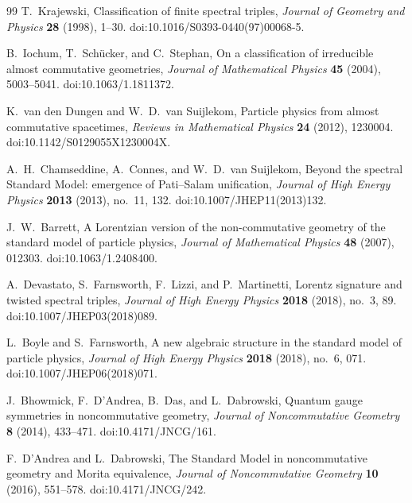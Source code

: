 \documentclass[11pt]{article}
\numberwithin{equation}{section}
\theoremstyle{definition}
\theoremstyle{remark}
\begin{document}
\begin{thebibliography}{99}
T.~Krajewski,
\newblock Classification of finite spectral triples,
\newblock \emph{Journal of Geometry and Physics} \textbf{28} (1998), 1--30.
\newblock doi:10.1016/S0393-0440(97)00068-5.

B.~Iochum, T.~Sch\"ucker, and C.~Stephan,
\newblock On a classification of irreducible almost commutative geometries,
\newblock \emph{Journal of Mathematical Physics} \textbf{45} (2004),
5003--5041.
\newblock doi:10.1063/1.1811372.

K.~van den Dungen and W.~D.~van Suijlekom,
\newblock Particle physics from almost commutative spacetimes,
\newblock \emph{Reviews in Mathematical Physics} \textbf{24} (2012),
1230004.
\newblock doi:10.1142/S0129055X1230004X.

A.~H.~Chamseddine, A.~Connes, and W.~D.~van Suijlekom,
\newblock Beyond the spectral Standard Model: emergence of Pati--Salam
unification,
\newblock \emph{Journal of High Energy Physics} \textbf{2013} (2013),
no.~11, 132.
\newblock doi:10.1007/JHEP11(2013)132.

J.~W.~Barrett,
\newblock A Lorentzian version of the non-commutative geometry of the standard
model of particle physics,
\newblock \emph{Journal of Mathematical Physics} \textbf{48} (2007), 012303.
\newblock doi:10.1063/1.2408400.

A.~Devastato, S.~Farnsworth, F.~Lizzi, and P.~Martinetti,
\newblock Lorentz signature and twisted spectral triples,
\newblock \emph{Journal of High Energy Physics} \textbf{2018} (2018),
no.~3, 89.
\newblock doi:10.1007/JHEP03(2018)089.

L.~Boyle and S.~Farnsworth,
\newblock A new algebraic structure in the standard model of particle physics,
\newblock \emph{Journal of High Energy Physics} \textbf{2018} (2018), no.~6, 071.
\newblock doi:10.1007/JHEP06(2018)071.

J.~Bhowmick, F.~D'Andrea, B.~Das, and L.~Dabrowski,
\newblock Quantum gauge symmetries in noncommutative geometry,
\newblock \emph{Journal of Noncommutative Geometry} \textbf{8} (2014),
433--471.
\newblock doi:10.4171/JNCG/161.

F.~D'Andrea and L.~Dabrowski,
\newblock The Standard Model in noncommutative geometry and Morita equivalence,
\newblock \emph{Journal of Noncommutative Geometry} \textbf{10} (2016),
551--578.
\newblock doi:10.4171/JNCG/242.


\end{thebibliography}
\end{document}
